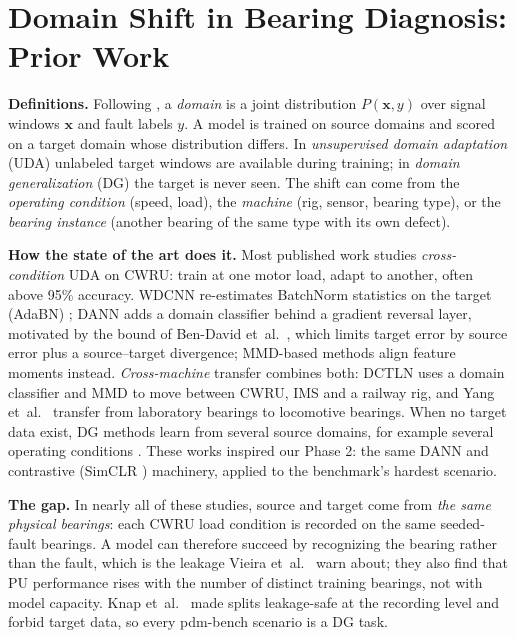\documentclass[conference]{IEEEtran}
\begin{document}
\section{Domain Shift in Bearing Diagnosis: Prior Work}\label{sec:prior}
\textbf{Definitions.} Following \cite{chen2023}, a \emph{domain} is a joint distribution
$P(\mathbf{x},y)$ over signal windows $\mathbf{x}$ and fault labels $y$. A model is trained on
source domains and scored on a target domain whose distribution differs. In \emph{unsupervised
domain adaptation} (UDA) unlabeled target windows are available during training; in
\emph{domain generalization} (DG) the target is never seen. The shift can come from the
\emph{operating condition} (speed, load), the \emph{machine} (rig, sensor, bearing type), or the
\emph{bearing instance} (another bearing of the same type with its own defect).

\textbf{How the state of the art does it.} Most published work studies \emph{cross-condition}
UDA on CWRU: train at one motor load, adapt to another, often above 95\% accuracy. WDCNN
re-estimates BatchNorm statistics on the target (AdaBN) \cite{zhang2017wdcnn}; DANN
\cite{ganin2015} adds a domain classifier behind a gradient reversal layer, motivated by the
bound of Ben-David et~al.\ \cite{bendavid2010}, which limits target error by source error plus a
source--target divergence; MMD-based methods \cite{long2015} align feature moments instead.
\emph{Cross-machine} transfer combines both: DCTLN \cite{guo2019} uses a domain classifier and
MMD to move between CWRU, IMS and a railway rig, and Yang et~al.\ \cite{yang2019} transfer from
laboratory bearings to locomotive bearings. When no target data exist, DG methods learn from
several source domains, for example several operating conditions \cite{li2020dg}.
These works inspired our Phase 2: the same DANN and contrastive (SimCLR \cite{chen2020simclr})
machinery, applied to the benchmark's hardest scenario.

\textbf{The gap.} In nearly all of these studies, source and target come from \emph{the same
physical bearings}: each CWRU load condition is recorded on the same seeded-fault bearings. A
model can therefore succeed by recognizing the bearing rather than the fault, which is the
leakage Vieira et~al.\ \cite{vieira2026} warn about; they also find that PU performance rises with
the number of distinct training bearings, not with model capacity. Knap et~al.\ \cite{knap2026}
made splits leakage-safe at the recording level and forbid target data, so every pdm-bench
scenario is a DG task.
\end{document}
